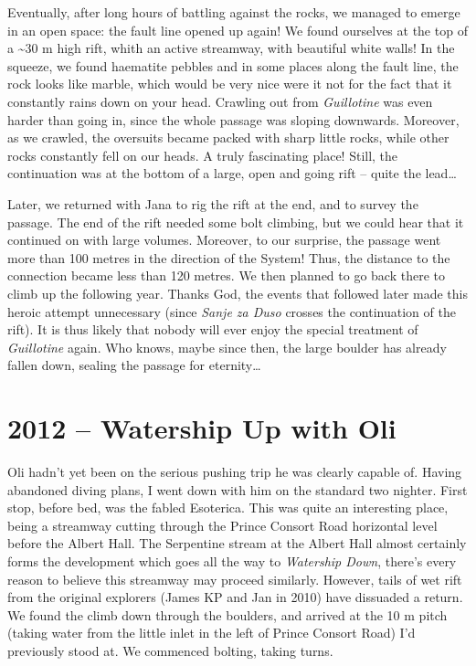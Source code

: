 Eventually, after long hours of battling against the rocks, we managed
to emerge in an open space: the fault line opened up again! We found
ourselves at the top of a \textasciitilde 30 m high rift, whith an
active streamway, with beautiful white walls! In the squeeze, we found
haematite pebbles and in some places along the fault line, the rock
looks like marble, which would be very nice were it not for the fact
that it constantly rains down on your head. Crawling out from
\emph{Guillotine} was even harder than going in, since the whole passage
was sloping downwards. Moreover, as we crawled, the oversuits became
packed with sharp little rocks, while other rocks constantly fell on our
heads. A truly fascinating place! Still, the continuation was at the
bottom of a large, open and going rift -- quite the lead\ldots{}

Later, we returned with Jana to rig the rift at the end, and to survey
the passage. The end of the rift needed some bolt climbing, but we could
hear that it continued on with large volumes. Moreover, to our surprise,
the passage went more than 100 metres in the direction of the System!
Thus, the distance to the connection became less than 120 metres. We
then planned to go back there to climb up the following year. Thanks
God, the events that followed later made this heroic attempt unnecessary
(since \emph{Sanje za Duso} 
crosses the continuation of the rift). It is thus likely that nobody
will ever enjoy the special treatment of \emph{Guillotine} again. Who
knows, maybe since then, the large boulder has already fallen down,
sealing the passage for eternity\ldots{}


\hypertarget{watership-up-with-oli}{%
\section{2012 -- Watership Up with Oli}\label{watership-up-with-oli}}

Oli hadn't yet been on the serious pushing trip he was clearly capable
of. Having abandoned diving plans, I went down with him on the standard
two nighter. First stop, before bed, was the fabled Esoterica. This was
quite an interesting place, being a streamway cutting through the Prince
Consort Road horizontal level before the Albert Hall. The Serpentine
stream at the Albert Hall almost certainly forms the development which
goes all the way to \emph{Watership Down}, there's every reason to
believe this streamway may proceed similarly. However, tails of wet rift
from the original explorers (James KP and Jan in 2010) have dissuaded a
return. We found the climb down through the boulders, and arrived at the
10 m pitch (taking water from the little inlet in the left of Prince
Consort Road) I'd previously stood at. We commenced bolting, taking
turns.

